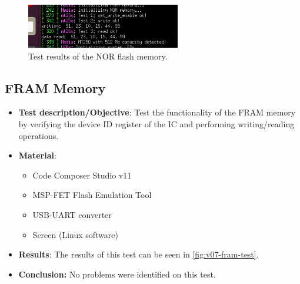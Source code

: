 \begin{figure}[!ht]
    \begin{center}
        \includegraphics[width=0.6\textwidth]{figures/v07/obdh2-v07-nor-results.png}
        \caption{Test results of the NOR flash memory.}
        \label{fig:v07-nor-test}
    \end{center}
\end{figure}

\subsection{FRAM Memory}

\begin{itemize}
    \item \textbf{Test description/Objective}: Test the functionality of the FRAM memory by verifying the device ID register of the IC and performing writing/reading operations.
    \item \textbf{Material}:
        \begin{itemize}
            \item Code Composer Studio v11
            \item MSP-FET Flash Emulation Tool
            \item USB-UART converter
            \item Screen (Linux software)
        \end{itemize}
    \item \textbf{Results}: The results of this test can be seen in \autoref{fig:v07-fram-test}.
    \item \textbf{Conclusion:} No problems were identified on this test.
\end{itemize}

